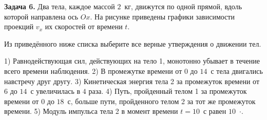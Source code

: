 \begin{taskbasic}[code={\label{task:newton2_v5_n5}}]
\textbf{Задача 6.} Два тела, каждое массой $2$~кг, движутся по одной прямой, вдоль которой направлена ось $Ox$. На рисунке приведены графики зависимости проекций $v_x$ их скоростей от времени $t$.
\begin{center}
\end{center}
Из приведённого ниже списка выберите все верные утверждения о движении тел.

1) Равнодействующая сил, действующих на тело 1, монотонно убывает в течение всего времени наблюдения.
2) В промежутке времени от $0$ до $14$~с тела двигались навстречу друг другу.
3) Кинетическая энергия тела 2 за промежуток времени от $6$ до $14$~с увеличилась в $4$ раза.
4) Путь, пройденный телом 1 за промежуток времени от $0$ до $18$~с, больше пути, пройденного телом 2 за тот же промежуток времени.
5) Модуль импульса тела 2 в момент времени $t=10$~с равен $10$~$\cdot$.

\end{taskbasic}

